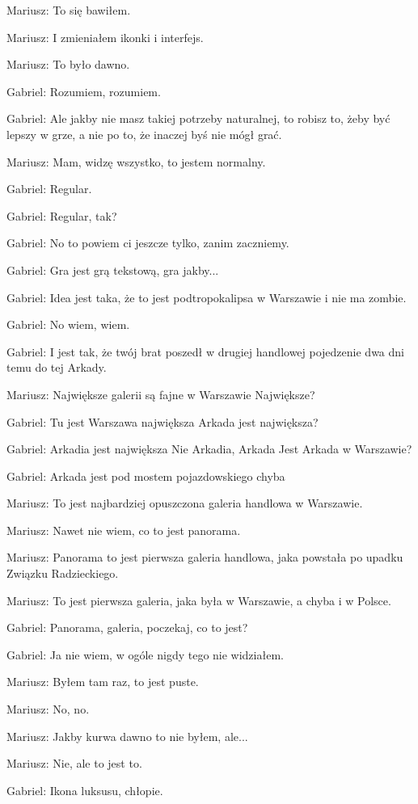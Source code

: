 Mariusz: To się bawiłem.

Mariusz: I zmieniałem ikonki i interfejs.

Mariusz: To było dawno.

Gabriel: Rozumiem, rozumiem.

Gabriel: Ale jakby nie masz takiej potrzeby naturalnej, to robisz to, żeby być lepszy w grze, a nie po to, że inaczej byś nie mógł grać.

Mariusz: Mam, widzę wszystko, to jestem normalny.

Gabriel: Regular.

Gabriel: Regular, tak?

Gabriel: No to powiem ci jeszcze tylko, zanim zaczniemy.

Gabriel: Gra jest grą tekstową, gra jakby...

Gabriel: Idea jest taka, że to jest podtropokalipsa w Warszawie i nie ma zombie.

Gabriel: No wiem, wiem.

Gabriel: I jest tak, że twój brat poszedł w drugiej handlowej pojedzenie dwa dni temu do tej Arkady.

Mariusz: Największe galerii są fajne w Warszawie Największe?

Gabriel: Tu jest Warszawa największa Arkada jest największa?

Gabriel: Arkadia jest największa Nie Arkadia, Arkada Jest Arkada w Warszawie?

Gabriel: Arkada jest pod mostem pojazdowskiego chyba

Mariusz: To jest najbardziej opuszczona galeria handlowa w Warszawie.

Mariusz: Nawet nie wiem, co to jest panorama.

Mariusz: Panorama to jest pierwsza galeria handlowa, jaka powstała po upadku Związku Radzieckiego.

Mariusz: To jest pierwsza galeria, jaka była w Warszawie, a chyba i w Polsce.

Gabriel: Panorama, galeria, poczekaj, co to jest?

Gabriel: Ja nie wiem, w ogóle nigdy tego nie widziałem.

Mariusz: Byłem tam raz, to jest puste.

Mariusz: No, no.

Mariusz: Jakby kurwa dawno to nie byłem, ale...

Mariusz: Nie, ale to jest to.

Gabriel: Ikona luksusu, chłopie.

